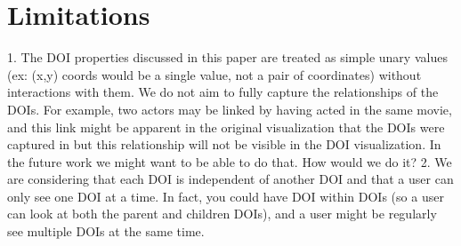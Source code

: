 \section{Limitations}
\label{sec:Limitations}
1.	The DOI properties discussed in this paper are treated as simple unary values (ex: (x,y) coords would be a single value, not a pair of coordinates) without interactions with them. We do not aim to fully capture the relationships of the DOIs. For example, two actors may be linked by having acted in the same movie, and this link might be apparent in the original visualization that the DOIs were captured in but this relationship will not be visible in the DOI visualization. In the future work we might want to be able to do that. How would we do it?
2.	We are considering that each DOI is independent of another DOI and that a user can only see one DOI at a time. In fact, you could have DOI within DOIs (so a user can look at both the parent and children DOIs), and a user might be regularly see multiple DOIs at the same time. 



